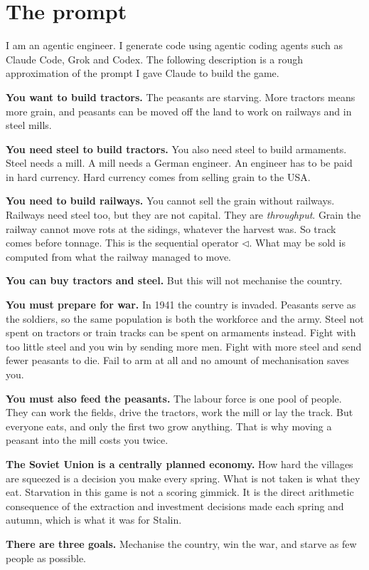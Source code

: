 \documentclass[11pt,a4paper]{article}
\begin{document}
\vspace{6mm}

\section{The prompt}

I am an agentic engineer. I generate code using agentic coding agents such as Claude Code, Grok and
Codex. The following description is a rough approximation of the prompt I gave Claude to build the
game.

\begin{listbox}
\textbf{You want to build tractors.} The peasants are starving. More tractors means more grain, and
peasants can be moved off the land to work on railways and in steel mills.

\textbf{You need steel to build tractors.} You also need steel to build armaments. Steel needs a
mill. A mill needs a German engineer.
An engineer has to be paid in hard currency. Hard currency comes from selling grain to the USA.

\textbf{You need to build railways.} You cannot sell the grain without railways. Railways need steel too, but they are not capital. They are \emph{throughput}. Grain the railway cannot
move rots at the sidings, whatever the harvest was. So track comes before tonnage. This is the
sequential operator $\lhd$. What may be sold is computed from what the railway managed to move.

\textbf{You can buy tractors and steel.} But this will not mechanise the country.

\textbf{You must prepare for war.} In 1941 the country is invaded. Peasants serve as the soldiers, so the same population is both the workforce and
the army. Steel not spent on tractors or train tracks can be spent on armaments instead. Fight with too
little steel and you win by sending more men. Fight with more steel and send fewer peasants to die. Fail to arm at
all and no amount of mechanisation saves you.

\textbf{You must also feed the peasants.} The labour force is one pool of people. They can work the
fields, drive the tractors, work the mill or lay the track. But everyone eats, and only the first
two grow anything. That is why moving a peasant into the mill costs you twice.

\textbf{The Soviet Union is a centrally planned economy.} How hard the villages are squeezed is a decision
you make every spring. What is not taken is what
they eat. Starvation in this game is not a scoring gimmick. It is the direct arithmetic consequence
of the extraction and investment decisions made each spring and autumn, which is what it was for
Stalin.

\textbf{There are three goals.} Mechanise the country, win the war, and starve as few people as
possible.
\end{listbox}
\end{document}
